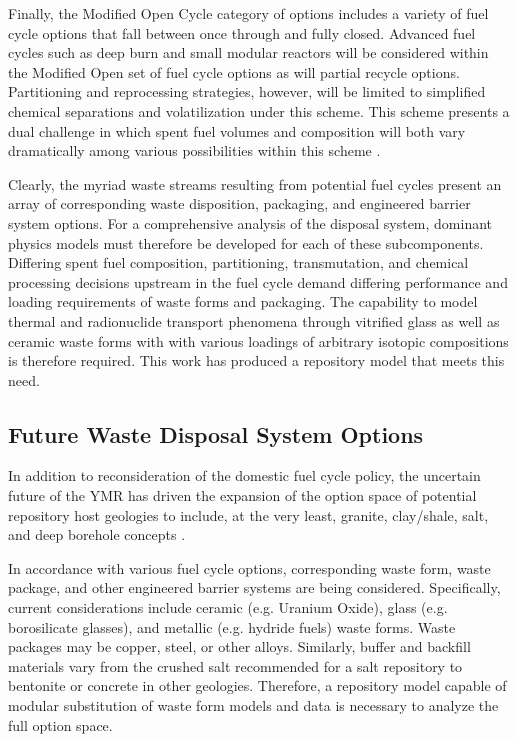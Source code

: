 
Finally, the Modified Open Cycle category of options includes a variety of fuel 
cycle options that fall between once through and fully closed. Advanced fuel 
cycles such as deep burn and small modular reactors will be considered within 
the Modified Open set of fuel cycle options as will partial recycle options.  
Partitioning and reprocessing strategies, however, will be limited to simplified 
chemical separations and volatilization under this scheme. This scheme presents
a dual challenge in which spent fuel volumes and composition will both vary 
dramatically among various possibilities within this scheme 
\cite{doe_nuclear_2010} .


Clearly, the myriad waste streams resulting from potential fuel cycles present 
an array of corresponding waste disposition, packaging, and engineered barrier 
system options. For a comprehensive analysis of the disposal system, dominant 
physics models must therefore be developed for each of these subcomponents.  Differing 
spent fuel composition, partitioning, transmutation, and chemical processing 
decisions upstream in the fuel cycle demand differing performance and loading 
requirements of waste forms and packaging. The capability to model thermal and 
radionuclide transport phenomena through vitrified glass as well 
as ceramic waste forms with with various loadings of arbitrary isotopic 
compositions is therefore required. This work has produced a repository model 
that meets this need. 

\subsection{Future Waste Disposal System Options}


In addition to reconsideration of the domestic fuel cycle policy, the uncertain 
future of the \gls{YMR} has driven the expansion of the option space of 
potential repository host geologies to include, at the very least, granite, 
clay/shale, salt, and deep borehole concepts \cite{nutt_used_2010}. 


In accordance with various fuel cycle options, corresponding waste form, waste 
package, and other engineered barrier systems are being considered.  
Specifically, current considerations include ceramic (e.g.  Uranium Oxide), 
glass (e.g.  borosilicate glasses), and metallic (e.g.  hydride fuels) waste 
forms. Waste packages may be copper, steel, or other alloys. Similarly, buffer 
and backfill materials vary from the crushed salt recommended for a salt 
repository to bentonite or concrete in other geologies. Therefore, a repository  
model capable of modular substitution of waste form models and data is
necessary to analyze the full option space.

